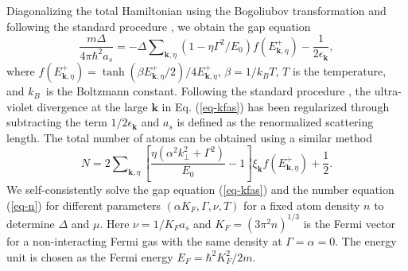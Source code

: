 \documentclass[prl,showpacs,twocolumn]{revtex4-1}
\begin{document}
Diagonalizing the total Hamiltonian using the Bogoliubov transformation and
following the standard procedure \cite{Review1}, we obtain the gap equation
\begin{equation}
{\frac{m\Delta }{4\pi \hbar ^{2}a_{s}}}=-\Delta \sum\nolimits_{\mathbf{k}%
,\eta }\left( 1-\eta \Gamma ^{2}/E_{0}\right) f\left( E_{\mathbf{k},\eta
}^{+}\right) -{\frac{1}{2\epsilon _{\mathbf{k}}}},  \label{eq-kfas}
\end{equation}%
where $f\left( E_{\mathbf{k},\eta }^{+}\right) =\tanh (\beta E_{\mathbf{k}%
,\eta }^{+}/2)/4E_{\mathbf{k},\eta }^{+}${, }$\beta =1/k_{B}T$, $T$ is the
temperature, and $k_{B}${\ is the Boltzmann constant. Following the standard
procedure \cite{Review1}, the ultra-violet divergence at the large $\mathbf{k%
}$ in Eq. (\ref{eq-kfas}) has been regularized through subtracting the term $%
1/2\epsilon _{\mathbf{k}}$ and $a_{s}$ is defined as the renormalized
scattering length. The total number of atoms can be obtained using a similar
method \cite{Review1}
\begin{equation}
N=2\sum\nolimits_{\mathbf{k},\eta }\left[ {\frac{\eta (\alpha ^{2}k_{\perp
}^{2}+\Gamma ^{2})}{E_{0}}}-1\right] \xi _{\mathbf{k}}f\left( E_{\mathbf{k}%
,\eta }^{+}\right) +{\frac{1}{2}.}  \label{eq-n}
\end{equation}%
We self-consistently solve the gap equation (\ref{eq-kfas}) and the number
equation (\ref{eq-n}) for different parameters $\left( \alpha K_{F},\Gamma
,\nu ,T\right) $ for a fixed atom density $n$ to determine $\Delta $ and $%
\mu $. Here $\nu =1/K_{F}a_{s}$ and $K_{F}=\left( 3\pi ^{2}n\right) ^{1/3}$
is the Fermi vector for a non-interacting Fermi gas with the same density at
$\Gamma =\alpha =0$. The energy unit is chosen as the Fermi energy $%
E_{F}=\hbar ^{2}K_{F}^{2}/2m$. }
\end{document}
